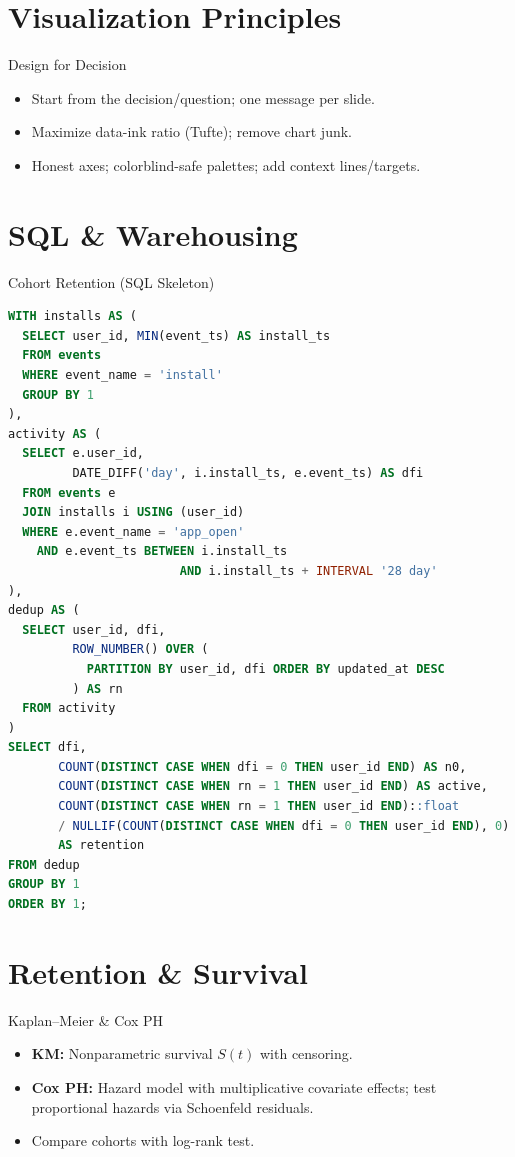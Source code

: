 \documentclass[aspectratio=169]{beamer}
\begin{document}
\section{Visualization Principles}
\begin{frame}{Design for Decision}
  \begin{itemize}
    \item Start from the decision/question; one message per slide.
    \item Maximize data-ink ratio (Tufte); remove chart junk.
    \item Honest axes; colorblind-safe palettes; add context lines/targets.
  \end{itemize}
\end{frame}

\section{SQL \& Warehousing}
\begin{frame}[fragile]{Cohort Retention (SQL Skeleton)}
\begin{lstlisting}[language=SQL,basicstyle=\ttfamily\tiny]
WITH installs AS (
  SELECT user_id, MIN(event_ts) AS install_ts
  FROM events
  WHERE event_name = 'install'
  GROUP BY 1
),
activity AS (
  SELECT e.user_id,
         DATE_DIFF('day', i.install_ts, e.event_ts) AS dfi
  FROM events e
  JOIN installs i USING (user_id)
  WHERE e.event_name = 'app_open'
    AND e.event_ts BETWEEN i.install_ts
                        AND i.install_ts + INTERVAL '28 day'
),
dedup AS (
  SELECT user_id, dfi,
         ROW_NUMBER() OVER (
           PARTITION BY user_id, dfi ORDER BY updated_at DESC
         ) AS rn
  FROM activity
)
SELECT dfi,
       COUNT(DISTINCT CASE WHEN dfi = 0 THEN user_id END) AS n0,
       COUNT(DISTINCT CASE WHEN rn = 1 THEN user_id END) AS active,
       COUNT(DISTINCT CASE WHEN rn = 1 THEN user_id END)::float
       / NULLIF(COUNT(DISTINCT CASE WHEN dfi = 0 THEN user_id END), 0)
       AS retention
FROM dedup
GROUP BY 1
ORDER BY 1;
\end{lstlisting}
\end{frame}

\section{Retention \& Survival}
\begin{frame}{Kaplan--Meier \& Cox PH}
  \begin{itemize}
    \item \textbf{KM:} Nonparametric survival $S(t)$ with censoring.
    \item \textbf{Cox PH:} Hazard model with multiplicative covariate effects; test proportional hazards via Schoenfeld residuals.
    \item Compare cohorts with log-rank test.
  \end{itemize}
\end{frame}
\end{document}
